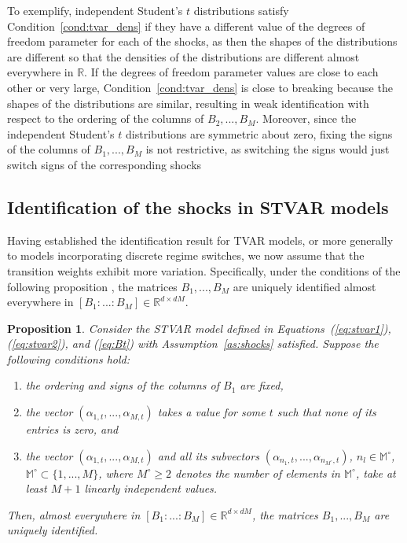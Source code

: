 \documentclass[nojss]{jss}
\newtheorem{proposition}{Proposition}
\begin{document}
To exemplify, independent Student's $t$ distributions satisfy Condition~\ref{cond:tvar_dens} if they have a different value of the degrees of freedom parameter for each of the shocks, as then the shapes of the distributions are different so that the densities of the distributions are different almost everywhere in $\mathbb{R}$. If the degrees of freedom parameter values are close to each other or very large, Condition~\ref{cond:tvar_dens} is close to breaking because the shapes of the distributions are similar, resulting in weak identification with respect to the ordering of the columns of $B_2,...,B_M$. Moreover, since the independent Student's $t$ distributions are symmetric about zero, fixing the signs of the columns of $B_1,...,B_M$ is not restrictive, as switching the signs would just switch signs of the corresponding shocks

\subsection{Identification of the shocks in STVAR models}\label{sec:identstvar}
Having established the identification result for TVAR models, or more generally to models incorporating discrete regime switches, we now assume that the transition weights exhibit more variation. Specifically, under the conditions of the following proposition \citep[][Proposition~2]{Virolainen2:2024}, the matrices $B_1,...,B_M$ are uniquely identified almost everywhere in $[B_1:...:B_M] \in\mathbb{R}^{d\times dM}$.

\begin{proposition}\label{prop:stvar_ident}
Consider the STVAR model defined in Equations~(\ref{eq:stvar1}), (\ref{eq:stvar2}), and (\ref{eq:Bt}) with Assumption~\ref{as:shocks} satisfied. Suppose the following conditions hold:
\begin{enumerate}%
\item the ordering and signs of the columns of $B_1$ are fixed,\label{cond:stvar_B_1}
\item the vector $(\alpha_{1,t},...,\alpha_{M,t})$ takes a value for some $t$ such that none of its entries is zero, and\label{cond:stvar_alpha}
\item the vector $(\alpha_{1,t},...,\alpha_{M,t})$ and all its subvectors $(\alpha_{n_1,t},...,\alpha_{n_{M^\circ},t})$, $n_l\in\mathbb{M^\circ}$, $\mathbb{M^\circ}\subset \lbrace 1,...,M \rbrace$, where $M^{\circ}\geq 2$ denotes the number of elements in $\mathbb{M^\circ}$, take at least $M+1$ linearly independent values.\label{cond:stvar_variability}
\end{enumerate}
Then, almost everywhere in $[B_1:...:B_M] \in\mathbb{R}^{d\times dM}$, the matrices $B_1,...,B_M$ are uniquely identified.
\end{proposition}
\end{document}
